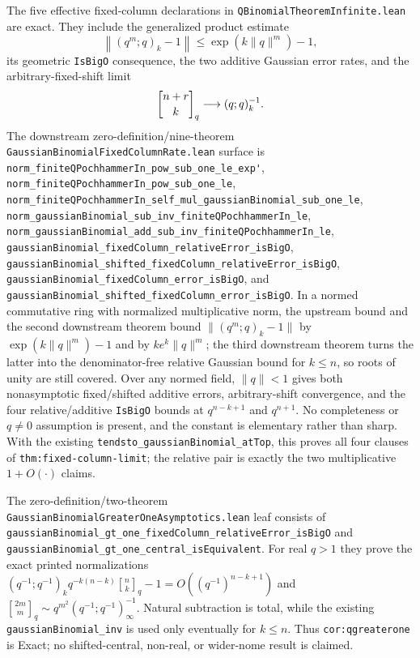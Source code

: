 \documentclass[11pt,oneside]{article}
\theoremstyle{definition}
\theoremstyle{remark}
\begin{document}
The five effective fixed-column declarations in
\nolinkurl{QBinomialTheoremInfinite.lean} are exact.  They include the
generalized product estimate
\[
 \left\lVert(q^m;q)_k-1\right\rVert
 \le \exp\!\left(k\lVert q\rVert^m\right)-1,
\]
its geometric \nolinkurl{IsBigO} consequence, the two additive Gaussian error
rates, and the arbitrary-fixed-shift limit
\[
 \GaussianBinomial{n+r}{k}{q}\longrightarrow(q;q)_k^{-1}.
\]
The downstream zero-definition/nine-theorem
\nolinkurl{GaussianBinomialFixedColumnRate.lean} surface is
\nolinkurl{norm_finiteQPochhammerIn_pow_sub_one_le_exp'},
\nolinkurl{norm_finiteQPochhammerIn_pow_sub_one_le},
\nolinkurl{norm_finiteQPochhammerIn_self_mul_gaussianBinomial_sub_one_le},
\nolinkurl{norm_gaussianBinomial_sub_inv_finiteQPochhammerIn_le},
\nolinkurl{norm_gaussianBinomial_add_sub_inv_finiteQPochhammerIn_le},
\nolinkurl{gaussianBinomial_fixedColumn_relativeError_isBigO},
\nolinkurl{gaussianBinomial_shifted_fixedColumn_relativeError_isBigO},
\nolinkurl{gaussianBinomial_fixedColumn_error_isBigO}, and
\nolinkurl{gaussianBinomial_shifted_fixedColumn_error_isBigO}.
In a normed commutative ring with normalized multiplicative norm, the upstream
bound and the second downstream theorem bound
\(\lVert(q^m;q)_k-1\rVert\) by
\(\exp(k\lVert q\rVert^m)-1\) and by
\(k e^k\lVert q\rVert^m\); the third downstream theorem turns the latter into
the denominator-free relative Gaussian bound for \(k\le n\), so roots of
unity are still covered.  Over any normed field,
\(\lVert q\rVert<1\) gives both
nonasymptotic fixed/shifted additive errors, arbitrary-shift convergence, and the four
relative/additive \nolinkurl{IsBigO} bounds at \(q^{n-k+1}\) and
\(q^{n+1}\).  No completeness or \(q\ne0\) assumption is present, and the
constant is elementary rather than sharp.  With the existing
\nolinkurl{tendsto_gaussianBinomial_atTop}, this proves all four clauses of
\nolinkurl{thm:fixed-column-limit}; the relative pair is exactly the two
multiplicative \(1+O(\cdot)\) claims.

The zero-definition/two-theorem
\nolinkurl{GaussianBinomialGreaterOneAsymptotics.lean} leaf consists of
\nolinkurl{gaussianBinomial_gt_one_fixedColumn_relativeError_isBigO} and
\nolinkurl{gaussianBinomial_gt_one_central_isEquivalent}.  For real \(q>1\)
they prove the exact printed normalizations
\((q^{-1};q^{-1})_kq^{-k(n-k)}{n\brack k}_q-1=
O((q^{-1})^{n-k+1})\) and
\({2m\brack m}_q\sim q^{m^2}(q^{-1};q^{-1})_\infty^{-1}\).
Natural subtraction is total, while the existing
\nolinkurl{gaussianBinomial_inv} is used only eventually for \(k\le n\).
Thus \nolinkurl{cor:qgreaterone} is Exact; no shifted-central, non-real, or
wider-nome result is claimed.
\end{document}
